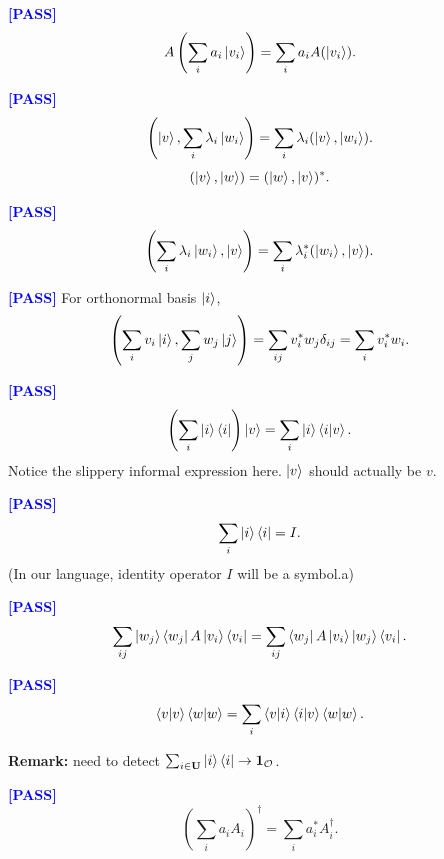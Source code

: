 \documentclass[manuscript, review, timestamp]{acmart}
\newcommand{\pass}{\textcolor{blue}{\textbf{ [PASS] }}}
\begin{document}
\begin{example}[QCQI (2.10)] \pass
  $$
  A\left( \sum_i a_i \ket{v_i} \right) = \sum_i a_i A(\ket{v_i}).
  $$
\end{example}

\begin{example}[QCQI (2.13)] \pass
  $$
  \left( \ket{v}, \sum_i \lambda_i \ket{w_i} \right) = \sum_i \lambda_i (\ket{v}, \ket{w_i}).
  $$
  $$
  (\ket{v}, \ket{w}) = (\ket{w}, \ket{v})^*.
  $$
\end{example}

\begin{example} \pass
  $$
  \left( \sum_i \lambda_i \ket{w_i}, \ket{v} \right) = \sum_i \lambda_i^* (\ket{w_i}, \ket{v}).
  $$
\end{example}

\begin{example}[QCQI (2.18)] \pass
  For orthonormal basis $\ket{i}$,
  $$
  \left( \sum_i v_i \ket{i}, \sum_j w_j \ket{j} \right) = \sum_{ij}v_i^*w_j \delta_{ij} = \sum_i v_i^* w_i.
  $$
\end{example}

\begin{example}[QCQI (2.21)] \pass
  $$
  \left( \sum_i \ket{i}\bra{i} \right) \ket{v} = \sum_i \ket{i} \braket{i|v}.
  $$
  Notice the slippery informal expression here. $\ket{v}$ should actually be $v$.
\end{example}

\begin{example}[QCQI (2.22)] \pass
  $$
  \sum_i\ket{i}\bra{i} = I.
  $$
  (In our language, identity operator $I$ will be a symbol.a)
\end{example}


\begin{example}[QCQI (2.24-2.25)] \pass
  $$
  \sum_{ij} \ket{w_j}\bra{w_j}A\ket{v_i}\bra{v_i} = \sum_{ij}\bra{w_j}A\ket{v_i}\ket{w_j}\bra{v_i}.
  $$
\end{example}

\begin{example}[QCQI (2.26)] \pass
  $$
  \braket{v|v}\braket{w|w} = \sum_i\braket{v|i}\braket{i|v}\braket{w|w}.
  $$
\end{example}
\textbf{Remark:} need to detect $\sum_{i\in\mathbf{U}}\ket{i}\bra{i} \to \mathbf{1}_\mathcal{O}$.

\begin{example} \pass
  $$
  \left( \sum_i a_i A_i \right)^\dagger = \sum_i a_i^* A_i^\dagger.
  $$
\end{example}
\end{document}
